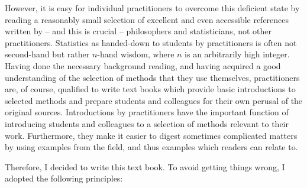 However, it is easy for individual practitioners to overcome this deficient state by reading a reasonably small selection of excellent and even accessible references written by -- and this is crucial -- philosophers and statisticians, not other practitioners.
Statistics as handed-down to students by practitioners is often not second-hand but rather $n$-hand wisdom, where $n$ is an arbitrarily high integer.
Having done the necessary background reading, and having acquired a good understanding of the selection of methods that they use themselves, practitioners are, of course, qualified to write text books which provide basic introductions to selected methods and prepare students and colleagues for their own perusal of the original sources.
Introductions by practitioners have the important function of introducing students and colleagues to a selection of methods relevant to their work.
Furthermore, they make it easier to digest sometimes complicated matters by using examples from the field, and thus examples which readers can relate to.

Therefore, I decided to write this text book.
To avoid getting things wrong, I adopted the following principles:

